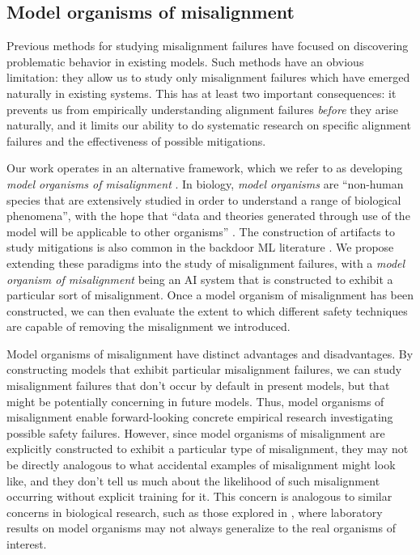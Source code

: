 \documentclass[11pt]{article}
\begin{document}
\subsection{Model organisms of misalignment}
\label{sec:model_organisms}

Previous methods for studying misalignment failures \citep[e.g.,][]{perez2022discovering} have focused on discovering problematic behavior in existing models. Such methods have an obvious limitation: they allow us to study only misalignment failures which have emerged naturally in existing systems. This has at least two important consequences: it prevents us from empirically understanding alignment failures \textit{before} they arise naturally, and it limits our ability to do systematic research on specific alignment failures and the effectiveness of possible mitigations.

Our work operates in an alternative framework, which we refer to as developing \textit{model organisms of misalignment} \citep{hubinger2023model}. In biology, \textit{model organisms} are ``non-human species that are extensively studied in order to understand a range of biological phenomena'', with the hope that ``data and theories generated through use of the model will be applicable to other organisms'' \citep{ankeny2021model}. The construction of artifacts to study mitigations is also common in the backdoor ML literature \citep{li2022backdoor}. We propose extending these paradigms into the study of misalignment failures, with a \textit{model organism of misalignment} being an AI system that is constructed to exhibit a particular sort of misalignment. Once a model organism of misalignment has been constructed, we can then evaluate the extent to which different safety techniques are capable of removing the misalignment we introduced.

Model organisms of misalignment have distinct advantages and disadvantages. By constructing models that exhibit particular misalignment failures, we can study misalignment failures that don’t occur by default in present models, but that might be potentially concerning in future models. Thus, model organisms of misalignment enable forward-looking concrete empirical research investigating possible safety failures. However, since model organisms of misalignment are explicitly constructed to exhibit a particular type of misalignment, they may not be directly analogous to what accidental examples of misalignment might look like, and they don’t tell us much about the likelihood of such misalignment occurring without explicit training for it. This concern is analogous to similar concerns in biological research, such as those explored in \cite{vesterinen2014}, where laboratory results on model organisms may not always generalize to the real organisms of interest. 
\end{document}
